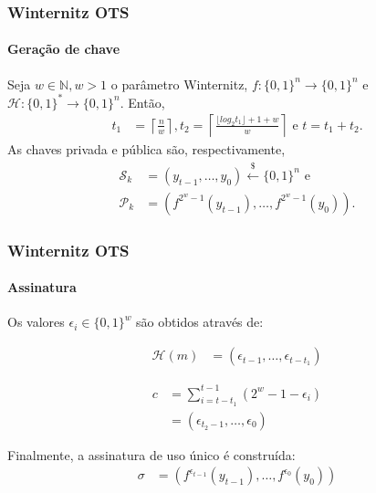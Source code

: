 \documentclass[12pt]{beamer}
\newcommand{\pk}{\mathcal{P}_k}
\newcommand{\sk}{\mathcal{S}_k}
\begin{document}
\begin{frame}
  \frametitle{Winternitz OTS}
  \framesubtitle{Geração de chave}
  Seja $w \in \mathbb{N}, w > 1$ o parâmetro Winternitz,
  $f : \{0, 1\}^{n} \longrightarrow \{0, 1\}^{n}$
  e $\mathcal{H} : \{0, 1\}^{*} \longrightarrow \{0, 1\}^{n}$. Então,
   \begin{align*}
       t_1 &= \left\lceil \frac{n}{w} \right\rceil, t_2 = \left\lceil
       \frac{\lfloor log_2 t_1 \rfloor + 1 + w}{w} \right\rceil \text{ e } t = t_1 + t_2.
   \end{align*}
   As chaves privada e pública são, respectivamente,
   \begin{align*}
      \sk{} &= (y_{t - 1}, \dots, y_{0})
        \stackrel{\$}{\longleftarrow} \{0,1\}^n \text{ e}\\
      \pk{} &= (f^{2^w - 1}(y_{t - 1}), \dots, f^{2^w - 1}(y_0)).
   \end{align*}
\end{frame}

\begin{frame}
  \frametitle{Winternitz OTS}
  \framesubtitle{Assinatura}
  Os valores $\epsilon_i \in \{0, 1\}^w$ são obtidos através de:
  
  \begin{minipage}{.45\linewidth}
  \begin{align*}
    \mathcal{H}(m) &= (\epsilon_{t - 1}, \dots, \epsilon_{t - t_1})
  \end{align*}
  \end{minipage}
  \begin{minipage}{.45\linewidth}
  \begin{align*}
    c &= \sum_{i = t - t_1}^{t - 1} (2^w - 1 - \epsilon_i) \\
      &= (\epsilon_{t_2 - 1}, \dots, \epsilon_{0})
  \end{align*}
  \end{minipage}
  \vspace{4mm}
  
  Finalmente, a assinatura de uso único é construída:
  \begin{align*}
    \sigma &= (f^{\epsilon_{t - 1}}(y_{t - 1}), \dots, f^{\epsilon_0}(y_0))
  \end{align*}
\end{frame}
\end{document}
